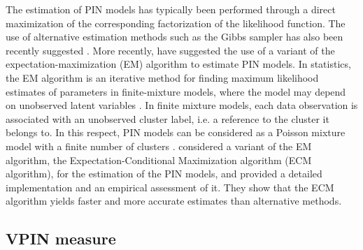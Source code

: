 The estimation of PIN models has typically been performed through a direct maximization of the corresponding factorization of the likelihood function. The use of alternative estimation methods such as the Gibbs sampler has also been recently suggested \citep{griffin2021}. More recently, \cite{ghachem2022maximum} have suggested the use of a variant of the expectation-maximization (EM) algorithm to estimate PIN models. In statistics, the EM algorithm is an iterative method for finding maximum likelihood estimates of parameters in finite-mixture models, where the model may depend on unobserved latent variables \citep{Ng2012EM}. In finite mixture models, each data observation is associated with an unobserved cluster label, i.e. a reference to the cluster it belongs to.  In this respect, PIN models can be considered as a Poisson mixture model with a finite number of clusters \citep{lin2015application, ghachem2022maximum}.
\cite{ghachem2022maximum} considered a variant of the EM algorithm, the Expectation-Conditional Maximization algorithm (ECM algorithm),  for the estimation of the PIN models, and  provided a detailed implementation and an empirical assessment of it. They show that the ECM algorithm yields faster and more accurate estimates than alternative methods. 

\subsection{VPIN measure}

